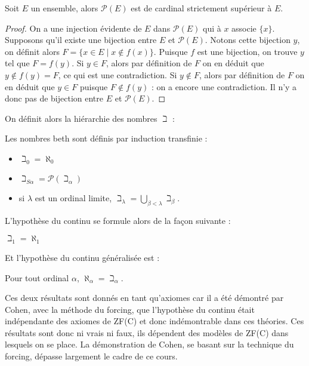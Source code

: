 \begin{them}[Cantor]
    Soit $E$ un ensemble, alors $\mathcal P(E)$ est de cardinal strictement supérieur à $E$.
\end{them}

\begin{proof}
    On a une injection évidente de $E$ dans $\mathcal P(E)$ qui à $x$ associe $\{x\}$. Supposons qu'il existe une bijection entre $E$ et $\mathcal P(E)$. Notons cette bijection $y$, on définit alors $F = \{ x \in E \mid x\notin f(x)\}$. Puisque $f$ est une bijection, on trouve $y$ tel que $F = f(y)$. Si $y\in F$, alors par définition de $F$ on en déduit que $y\notin f(y) = F$, ce qui est une contradiction. Si $y\notin F$, alors par définition de $F$ on en déduit que $y\in F$ puisque $F\notin f(y)$ : on a encore une contradiction. Il n'y a donc pas de bijection entre $E$ et $\mathcal P(E)$.
\end{proof}

On définit alors la hiérarchie des nombres $\beth$ :

\begin{defi}[Beth]
    Les nombres beth sont définis par induction transfinie :
    \begin{itemize}[label=$\bullet$]
        \item $\beth_0 = \aleph_0$
        \item $\beth_{S\alpha} = \mathcal P(\beth_\alpha)$
        \item si $\lambda$ est un ordinal limite, $\beth_\lambda = \bigcup_{\beta < \lambda} \beth_\beta$.
    \end{itemize}
\end{defi}

L'hypothèse du continu se formule alors de la façon suivante :

\begin{ax}
    $\beth_1 = \aleph_1$
\end{ax}

Et l'hypothèse du continu généralisée est :

\begin{ax}
    Pour tout ordinal $\alpha$, $\aleph_\alpha = \beth_\alpha$.
\end{ax}

\begin{rmk}
    Ces deux résultats sont donnés en tant qu'axiomes car il a été démontré par Cohen, avec la méthode du forcing, que l'hypothèse du continu était indépendante des axiomes de ZF(C) et donc indémontrable dans ces théories. Ces résultats sont donc ni vrais ni faux, ils dépendent des modèles de ZF(C) dans lesquels on se place. La démonstration de Cohen, se basant sur la technique du forcing, dépasse largement le cadre de ce cours.
\end{rmk}